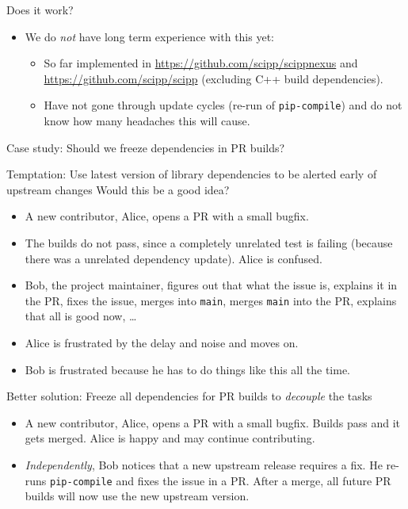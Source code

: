 \documentclass[english,aspectratio=1610,smaller]{beamer}
\newcommand{\scipp}{\texttt{scipp}\xspace}
\newcommand{\scippnexus}{\texttt{scippnexus}\xspace}
\begin{document}
\begin{frame}{Does it work?}
  \begin{itemize}
    \item We do \emph{not} have long term experience with this yet:
      \begin{itemize}
        \item So far implemented in \url{https://github.com/scipp/scippnexus} and \url{https://github.com/scipp/scipp} (excluding C++ build dependencies).
        \item Have not gone through update cycles (re-run of \texttt{pip-compile}) and do not know how many headaches this will cause.
      \end{itemize}
  \end{itemize}
\end{frame}

\begin{frame}{Case study: Should we freeze dependencies in PR builds?}
  \begin{block}{Temptation: Use latest version of library dependencies to be alerted early of upstream changes}
    Would this be a good idea?
    \pause
  \begin{itemize}[<+->]
    \item A new contributor, Alice, opens a PR with a small bugfix.
    \item The builds do not pass, since a completely unrelated test is failing (because there was a unrelated dependency update).
      Alice is confused.
    \item Bob, the project maintainer, figures out that what the issue is, explains it in the PR, fixes the issue, merges into \texttt{main}, merges \texttt{main} into the PR, explains that all is good now, \dots
    \item Alice is frustrated by the delay and noise and moves on.
    \item Bob is frustrated because he has to do things like this all the time.
  \end{itemize}
  \end{block}
  \pause
  \begin{block}{Better solution: Freeze all dependencies for PR builds to \emph{decouple} the tasks}
    \begin{itemize}
      \item A new contributor, Alice, opens a PR with a small bugfix. Builds pass and it gets merged. Alice is happy and may continue contributing.
      \item \emph{Independently}, Bob notices that a new upstream release requires a fix.
        He re-runs \texttt{pip-compile} and fixes the issue in a PR.
        After a merge, all future PR builds will now use the new upstream version.
    \end{itemize}
  \end{block}
\end{frame}
\end{document}
